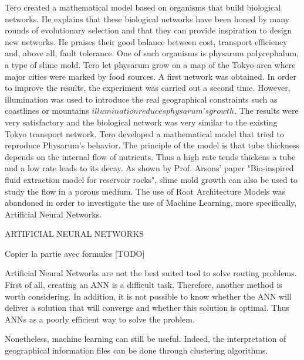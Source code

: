Tero created a mathematical model based on organisms that build biological networks. He
explains that these biological networks have been honed by many rounds of evolutionary
selection and that they can provide inspiration to design new networks. He praises their
good balance between cost, transport efficiency and, above all, fault tolerance. One of
such organisms is physarum polycephalum, a type of slime mold. Tero let physarum
grow on a map of the Tokyo area where major cities were marked by food sources. A
first network was obtained. In order to improve the results, the experiment was carried
out a second time. However, illumination was used to introduce the real geographical
constraints such as coastlines or mountains \(illumination reduces physarum’s growth\). The
results were very satisfactory and the biological network was very similar to the existing
Tokyo transport network. Tero developed a mathematical model that tried to reproduce
Physarum’s behavior. The principle of the model is that tube thickness depends on the
internal flow of nutrients. Thus a high rate tends thickens a tube and a low rate leads
to its decay. As shown by Prof. Arsons’ paper "Bio-inspired fluid extraction model for
reservoir rocks", slime mold growth can also be used to study the flow in a porous medium.
The use of Root Architecture Models was abandoned in order to investigate the use of Machine Learning, more specifically, Artificial Neural Networks.

ARTIFICIAL NEURAL NETWORKS

Copier la partie avec formules [TODO]

Artificial Neural Networks are not the best suited tool to solve routing problems. First of all, creating an ANN is a difficult task. Therefore, another method is worth considering. In addition, it is not possible to know whether the ANN will deliver a solution that will converge and whether this solution is optimal. Thus ANNs as a poorly efficient way to solve the problem.

Nonetheless, machine learning can still be useful. Indeed, the interpretation of geographical information files can be done through clustering algorithms.